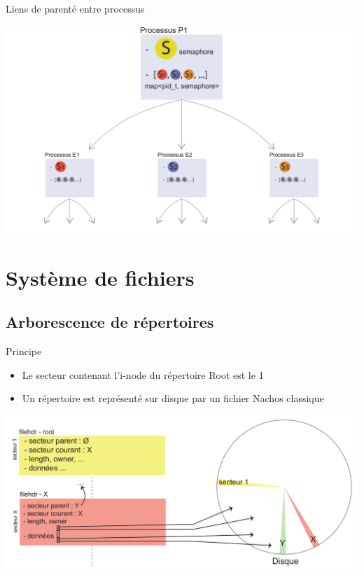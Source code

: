 \documentclass{beamer}
\begin{document}
\begin{frame}{Liens de parenté entre processus}
  	\begin{center}
	  	\includegraphics[scale=0.18]{images/FS6.png}
  	\end{center}
\end{frame}
\section{Système de fichiers}
\subsection{Arborescence de répertoires}
\begin{frame}
  \begin{block}{Principe}
  	\begin{itemize}%
  		\item Le secteur contenant l'i-node du répertoire Root est le 1
  		\item Un répertoire est représenté sur disque par un fichier Nachos classique
  	\end{itemize}  
  \end{block}
  \begin{center}
	  \includegraphics[scale=0.21]{images/FS1.png}
  \end{center}
\end{frame}
\end{document}
